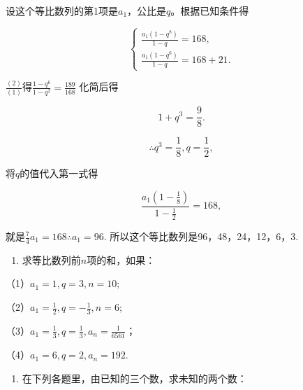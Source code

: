 设这个等比数列的第1项是\(a_1\)，公比是\(q\)。根据已知条件得

\[
\left\{ \begin{array}{l} \frac{a_{1} (1 - q^{8})}{1 - q} = 168, \\ \frac{a_{1} (1 - q^{6})}{1 - q} = 168 + 21. \end{array} \right. \tag {1}
\]

\(\frac{(2)}{(1)}\)得\(\frac{1 - q^6}{1 - q^2} = \frac{189}{168}\)
化简后得

\[
1 + q^{3} = \frac{9}{8}.
\]

\[
\therefore q^{3} = \frac{1}{8}, q = \frac{1}{2},
\]

将\(q\)的值代入第一式得

\[
\frac{a_{1} \left(1 - \frac{1}{8}\right)}{1 - \frac{1}{2}} = 168,
\]

就是\(\frac{7}{4} a_1 = 168\)\(\therefore a_1 = 96.\)
所以这个等比数列是96，48，24，12，6，3.

\begin{enumerate}
\item
  求等比数列前\(n\)项的和，如果：
\end{enumerate}

（1）\(a_{1} = 1, q = 3, n = 10;\)

（2）\(a_{1} = \frac{1}{2}, q = -\frac{1}{3}, n = 6;\)

（3）\(a_{1} = \frac{1}{3}, q = \frac{1}{3}, a_{n} = \frac{1}{6561}\)；

（4）\(a_{1} = 6, q = 2, a_{n} = 192.\)

\begin{enumerate}[start=2]
\item
  在下列各题里，由已知的三个数，求未知的两个数：
\end{enumerate}

{\centering
\scriptsize\setlength{\tabcolsep}{2.2pt}%
\par
}

